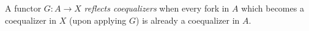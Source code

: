 A functor $G : A \to X$ \emph{reflects coequalizers} when every fork in $A$ which becomes a coequalizer in $X$ (upon applying $G$) is already a coequalizer in $A$.
